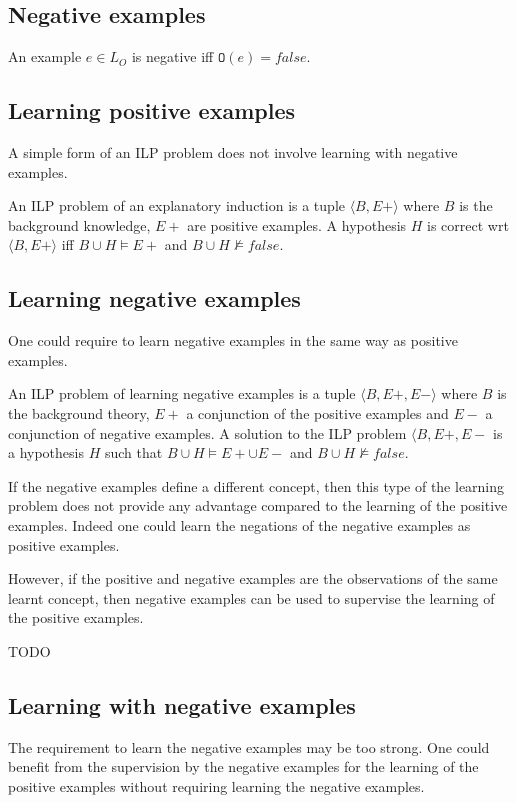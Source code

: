 \subsection{Negative examples}
An example $e \in L_O$ is negative iff $\mathtt{O}(e)=false$.
\subsection{Learning positive examples}
A simple form of an ILP problem does not involve learning with negative examples.
\begin{defn}
An ILP problem of an explanatory induction\cite{yamamoto2012inverse} is a tuple $\langle B, E+ \rangle$ where $B$ is the background knowledge, $E+$ are positive examples. A hypothesis $H$ is correct wrt $\langle B, E+\rangle$ iff
$B \cup H \models E+$ and $B \cup H \not\models false$.
\end{defn}
\subsection{Learning negative examples}
One could require to learn negative examples in the same way as positive examples.
\begin{defn}
An ILP problem of learning negative examples is a tuple $\langle B, E+, E- \rangle$ where $B$ is the background theory, $E+$ a conjunction of the positive examples and $E-$ a conjunction of negative examples. A solution to the ILP problem $\langle B, E+, E-$ is a hypothesis $H$ such that
$B \cup H \models E+ \cup E-$ and $B \cup H \not\models false$.
\end{defn}
If the negative examples define a different concept, then this type of the learning problem does not provide any advantage compared to the learning of the positive examples. Indeed one could learn the negations of the negative examples as positive examples.

However, if the positive and negative examples are the observations of the same learnt concept, then negative examples can be used to supervise the learning of the positive examples.

\begin{exmp}
TODO
\end{exmp}

\subsection{Learning with negative examples}
The requirement to learn the negative examples may be too strong. One could benefit from the supervision by the negative examples for the learning of the positive examples without requiring learning the negative examples.

